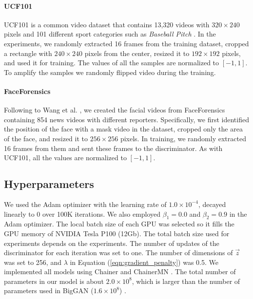 \documentclass[twocolumn]{svjour3}
\def\Eq#1{Equation (\ref{eqn:#1})}
\begin{document}
\paragraph{UCF101}
UCF101 is a common video dataset that contains
13,320 videos with $320 \times 240$ pixels and 101 different sport categories such as
{\it Baseball Pitch} \cite{Soomro2012}.
In the experiments, we randomly extracted 16 frames from the training dataset,
cropped a rectangle with $240 \times 240$ pixels from the center, resized it to $192 \times 192$ pixels,
and used it for training.
The values of all the samples are normalized to $[-1, 1]$.
To amplify the samples we randomly flipped video during the training.

\paragraph{FaceForensics}
Following to Wang et al. \cite{Wang2018}, we created the facial videos from FaceForensics \cite{Rossler2018}
containing 854 news videos with different reporters. Specifically, we first identified the position of the face with a mask video in the dataset, cropped only the area of the face, and resized it to $256 \times 256$ pixels. In training, we randomly extracted 16 frames from them and sent these frames to the discriminator.
As with UCF101, all the values are normalized to $[-1, 1]$.

\subsection{Hyperparameters}
We used the Adam \cite{Kingma2015} optimizer with the learning rate of $1.0 \times 10^{-4}$, decayed linearly to 0 over 100K iterations. We also employed $\beta_1 = 0.0$ and $\beta_2 = 0.9$ in the Adam optimizer.
The local batch size of each GPU was selected so it fills the GPU memory of NVIDIA Tesla P100 (12Gb).
The total batch size used for experiments depends on the experiments.
The number of updates of the discriminator for each iteration was set to one.
The number of dimensions of $\vec{z}$ was set to 256, and $\lambda$ in \Eq{gradient_penalty} was 0.5.
We implemented all models using Chainer \cite{Tokui2015} and ChainerMN \cite{Akiba2017}.
The total number of parameters in our model is about $2.0 \times 10^8$, which is larger than the number of parameters used in BigGAN ($1.6 \times 10^8$) \cite{Brock2018}.
\end{document}
